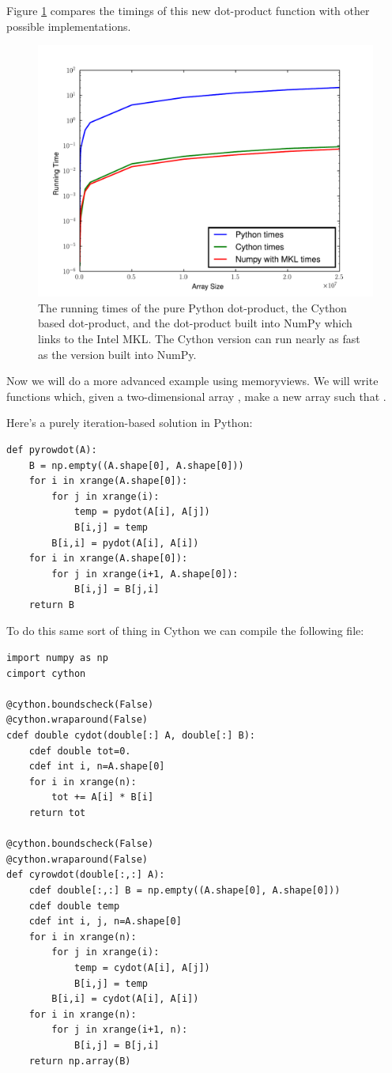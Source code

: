 Figure \ref{cython:dot} compares the timings of this new dot-product function with other possible implementations.

\begin{figure}
\centering
\includegraphics[width=\textwidth]{dot.pdf}
\caption{The running times of the pure Python dot-product, the Cython based dot-product, and the dot-product built into NumPy which links to the Intel MKL.
The Cython version can run nearly as fast as the version built into NumPy.}
\label{cython:dot}
\end{figure}

Now we will do a more advanced example using memoryviews.
We will write functions which, given a two-dimensional array , make a new array  such that
.

Here's a purely iteration-based solution in Python:
\begin{lstlisting}
def pyrowdot(A):
    B = np.empty((A.shape[0], A.shape[0]))
    for i in xrange(A.shape[0]):
        for j in xrange(i):
            temp = pydot(A[i], A[j])
            B[i,j] = temp
        B[i,i] = pydot(A[i], A[i])
    for i in xrange(A.shape[0]):
        for j in xrange(i+1, A.shape[0]):
            B[i,j] = B[j,i]
    return B
\end{lstlisting}

To do this same sort of thing in Cython we can compile the following file:

\begin{lstlisting}
import numpy as np
cimport cython

@cython.boundscheck(False)
@cython.wraparound(False)
cdef double cydot(double[:] A, double[:] B):
    cdef double tot=0.
    cdef int i, n=A.shape[0]
    for i in xrange(n):
        tot += A[i] * B[i]
    return tot

@cython.boundscheck(False)
@cython.wraparound(False)
def cyrowdot(double[:,:] A):
    cdef double[:,:] B = np.empty((A.shape[0], A.shape[0]))
    cdef double temp
    cdef int i, j, n=A.shape[0]
    for i in xrange(n):
        for j in xrange(i):
            temp = cydot(A[i], A[j])
            B[i,j] = temp
        B[i,i] = cydot(A[i], A[i])
    for i in xrange(n):
        for j in xrange(i+1, n):
            B[i,j] = B[j,i]
    return np.array(B)
\end{lstlisting}

